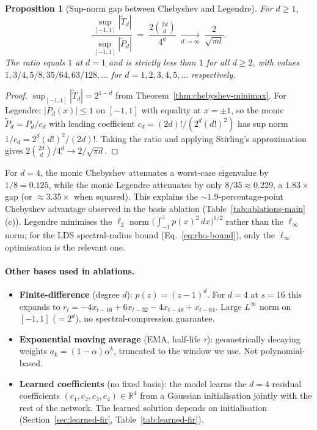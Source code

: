 \documentclass[11pt]{article}
\theoremstyle{plain}
\newtheorem{proposition}[theorem]{Proposition}
\theoremstyle{definition}
\theoremstyle{remark}
\newcommand{\R}{\mathbb{R}}
\newcommand{\abs}[1]{\left\lvert#1\right\rvert}
\begin{document}
\begin{proposition}[Sup-norm gap between Chebyshev and Legendre]
\label{prop:cheb-vs-legendre}
For $d \geq 1$,
\[
    \frac{\sup_{[-1,1]} \abs{\tilde T_d}}{\sup_{[-1,1]} \abs{\tilde P_d}} \;=\; \frac{2 \binom{2d}{d}}{4^d} \;\xrightarrow[d \to \infty]{}\; \frac{2}{\sqrt{\pi d}}.
\]
The ratio equals $1$ at $d = 1$ and is strictly less than $1$ for all $d \geq 2$, with values $1, 3/4, 5/8, 35/64, 63/128, \ldots$ for $d = 1, 2, 3, 4, 5, \ldots$ respectively.
\end{proposition}

\begin{proof}
$\sup_{[-1,1]} \abs{\tilde T_d} = 2^{1-d}$ from Theorem~\ref{thm:chebyshev-minimax}. For Legendre: $\abs{P_d(x)} \leq 1$ on $[-1,1]$ with equality at $x = \pm 1$, so the monic $\tilde P_d = P_d / c_d$ with leading coefficient $c_d = (2d)!/(2^d (d!)^2)$ has sup norm $1/c_d = 2^d (d!)^2 / (2d)!$. Taking the ratio and applying Stirling's approximation gives $2 \binom{2d}{d}/4^d \to 2/\sqrt{\pi d}$.
\end{proof}

For $d = 4$, the monic Chebyshev attenuates a worst-case eigenvalue by $1/8 = 0.125$, while the monic Legendre attenuates by only $8/35 \approx 0.229$, a $1.83\times$ gap (or $\approx 3.35\times$ when squared). This explains the $\sim 1.9$-percentage-point Chebyshev advantage observed in the basis ablation (Table~\ref{tab:ablations-main}(c)). Legendre minimises the $\ell_2$ norm $\bigl(\int_{-1}^{1} p(x)^2 \, dx\bigr)^{1/2}$ rather than the $\ell_\infty$ norm; for the LDS spectral-radius bound (Eq.~\eqref{eq:rho-bound}), only the $\ell_\infty$ optimisation is the relevant one.

\paragraph{Other bases used in ablations.}
\begin{itemize}[leftmargin=1.5em]
    \item \textbf{Finite-difference} (degree $d$): $p(z) = (z - 1)^d$. For $d = 4$ at $s = 16$ this expands to $r_t = -4 x_{t-16} + 6 x_{t-32} - 4 x_{t-48} + x_{t-64}$. Large $L^\infty$ norm on $[-1,1]$ ($= 2^d$), no spectral-compression guarantee.
    \item \textbf{Exponential moving average} (EMA, half-life $\tau$): geometrically decaying weights $a_k = (1-\alpha) \alpha^k$, truncated to the window we use. Not polynomial-based.
    \item \textbf{Learned coefficients} (no fixed basis): the model learns the $d = 4$ residual coefficients $(c_1, c_2, c_3, c_4) \in \R^4$ from a Gaussian initialisation jointly with the rest of the network. The learned solution depends on initialisation (Section~\ref{sec:learned-fir}, Table~\ref{tab:learned-fir}).
\end{itemize}
\end{document}
